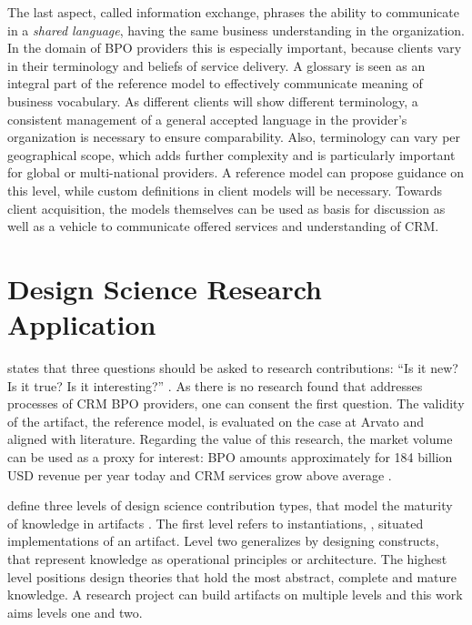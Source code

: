 The last aspect, called information exchange, phrases the ability to communicate in a \textit{shared language}, \ie having the same business understanding in the organization. In the domain of BPO providers this is especially important, because clients vary in their terminology and beliefs of service delivery. A glossary is seen as an integral part of the reference model to effectively communicate meaning of business vocabulary. As different clients will show different terminology, a consistent management of a general accepted language in the provider’s organization is necessary to ensure comparability. Also, terminology can vary per geographical scope, which adds further complexity and is particularly important for global or multi-national providers. A reference model can propose guidance on this level, while custom definitions in client models will be necessary. Towards client acquisition, the models themselves can be used as basis for discussion as well as a vehicle to communicate offered services and understanding of CRM.


%

\section{Design Science Research Application}

 \citeauthor{wilson2002responsible} states that three questions should be asked to research contributions: \enquote{Is it new? Is it true? Is it interesting?} \citep[]{wilson2002responsible}. As there is no research found that addresses processes of CRM BPO providers, one can consent the first question. The validity of the artifact, \viz the reference model, is evaluated on the case at Arvato and aligned with literature. Regarding the value of this research, the market volume can be used as a proxy for interest: BPO amounts approximately for 184 billion USD revenue per year today and CRM services grow above average \citep{hfs2016top}.  

\citeauthor{gregor2013positioning} define three levels of design science contribution types, that model the maturity of knowledge in artifacts \citep[]{gregor2013positioning}. The first level refers to instantiations, \ie, situated implementations of an artifact. Level two generalizes by designing constructs, that represent knowledge as operational principles or architecture. The highest level positions design theories that hold the most abstract, complete and mature knowledge. A research project can build artifacts on multiple levels and this work aims levels one and two. 

